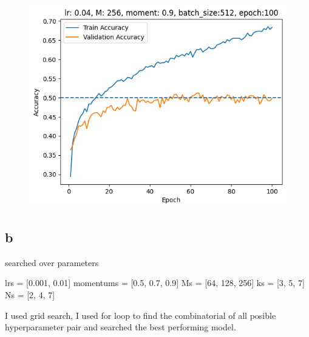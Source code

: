 \begin{figure}[!ht]
    \centering\includegraphics[width=1\linewidth]{A5-2.png}
\end{figure}



\subsection{b}

searched over parameters

lrs = [0.001, 0.01]
momentums = [0.5, 0.7, 0.9]
Ms = [64, 128, 256]
ks = [3, 5, 7]
Ns = [2, 4, 7]

I used grid search, I used for loop to find the combinatorial of all
posible hyperparameter pair and searched the best performing model.

